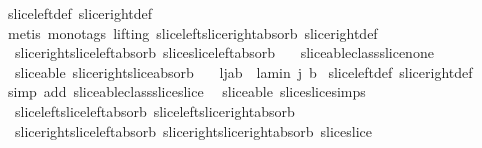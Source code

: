\begin{isabellebody}
%
\isadelimproof
%
\endisadelimproof
%
\isatagproof
{}\isamarkupfalse%
\ slice{\isacharunderscore}left{\isacharunderscore}def\ slice{\isacharunderscore}right{\isacharunderscore}def\isanewline
{}\isamarkupfalse%
\ {\isacharparenleft}metis\ {\isacharparenleft}mono{\isacharunderscore}tags{\isacharcomma}\ lifting{\isacharparenright}\ slice{\isacharunderscore}left{\isacharunderscore}slice{\isacharunderscore}right{\isacharunderscore}absorb\ slice{\isacharunderscore}right{\isacharunderscore}def\ \isanewline
\ \ slice{\isacharunderscore}right{\isacharunderscore}slice{\isacharunderscore}left{\isacharunderscore}absorb\ slice{\isacharunderscore}slice{\isacharunderscore}left{\isacharunderscore}absorb\ \isanewline
\ \ sliceable{\isacharunderscore}class{\isachardot}slice{\isacharunderscore}none{\isacharparenright}%
\endisatagproof
{\isafoldproof}%
%
\isadelimproof
\isanewline
%
\endisadelimproof
\isanewline
{}\isamarkupfalse%
\ {\isacharparenleft}\ sliceable{\isacharparenright}\ slice{\isacharunderscore}right{\isacharunderscore}slice{\isacharunderscore}absorb{\isacharcolon}\ \isanewline
\ \ {\isachardoublequoteopen}{\isacharparenleft}l{\isasymdagger}{\isachardot}{\isachardot}j{\isacharparenright}{\isasymdagger}a{\isachardot}{\isachardot}b\ {\isacharequal}\ l{\isasymdagger}a{\isachardot}{\isachardot}{\isacharparenleft}min\ j\ b{\isacharparenright}{\isachardoublequoteclose}\isanewline
%
\isadelimproof
%
\endisadelimproof
%
\isatagproof
{}\isamarkupfalse%
\ slice{\isacharunderscore}left{\isacharunderscore}def\ slice{\isacharunderscore}right{\isacharunderscore}def\isanewline
{}\isamarkupfalse%
\ {\isacharparenleft}simp\ add{\isacharcolon}\ sliceable{\isacharunderscore}class{\isachardot}slice{\isacharunderscore}slice{\isacharparenright}%
\endisatagproof
{\isafoldproof}%
%
\isadelimproof
\isanewline
%
\endisadelimproof
\isanewline
\isanewline
{}\isamarkupfalse%
\ {\isacharparenleft}\ sliceable{\isacharparenright}\ slice{\isacharunderscore}slice{\isacharunderscore}simps\ {\isacharequal}\ \isanewline
\ \ slice{\isacharunderscore}left{\isacharunderscore}slice{\isacharunderscore}left{\isacharunderscore}absorb\ slice{\isacharunderscore}left{\isacharunderscore}slice{\isacharunderscore}right{\isacharunderscore}absorb\isanewline
\ \ slice{\isacharunderscore}right{\isacharunderscore}slice{\isacharunderscore}left{\isacharunderscore}absorb\ slice{\isacharunderscore}right{\isacharunderscore}slice{\isacharunderscore}right{\isacharunderscore}absorb\ slice{\isacharunderscore}slice\isanewline

\end{isabellebody}
